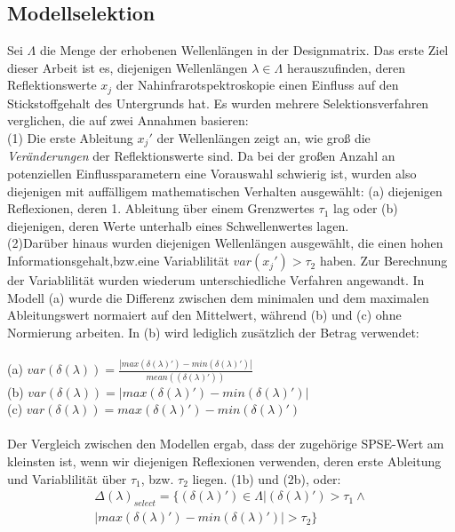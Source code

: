 	\subsection{Modellselektion}
	\label{ssec:modellselektion}
	Sei $\Lambda$ die Menge der erhobenen Wellenlängen in der Designmatrix.
	Das erste Ziel dieser Arbeit ist es, diejenigen Wellenlängen $\lambda\in\Lambda$ herauszufinden, deren Reflektionswerte $x_j$ der Nahinfrarotspektroskopie einen Einfluss auf den Stickstoffgehalt des Untergrunds hat.  Es wurden mehrere Selektionsverfahren verglichen, die auf zwei Annahmen basieren: \\
	(1) Die erste Ableitung $x_j'$ der Wellenlängen zeigt an, wie groß die \textit{Veränderungen} der Reflektionswerte sind. Da bei der großen Anzahl an potenziellen Einflussparametern eine Vorauswahl schwierig ist, wurden also diejenigen mit auffälligem mathematischen Verhalten ausgewählt: (a) diejenigen Reflexionen, deren 1. Ableitung über einem Grenzwertes $\tau_1$ lag oder (b) diejenigen, deren Werte unterhalb eines Schwellenwertes lagen.\\
	(2)Darüber hinaus wurden diejenigen Wellenlängen ausgewählt, die einen hohen Informationsgehalt,bzw.eine Variablilität $var(x_j') > \tau_2$ haben. Zur Berechnung der Variablilität wurden wiederum unterschiedliche Verfahren angewandt. In Modell (a) wurde die Differenz zwischen dem minimalen und dem maximalen Ableitungswert normaiert auf den Mittelwert, während (b) und (c) ohne Normierung arbeiten. In (b) wird lediglich zusätzlich der Betrag verwendet: 	\\ \\
	(a) $var(\delta(\lambda)) = \frac{|max(\delta(\lambda)') - min(\delta(\lambda)')|}{mean((\delta(\lambda)'))}$\\
	(b) $var(\delta(\lambda)) = |max(\delta(\lambda)') - min(\delta(\lambda)')|$\\
	(c) $var(\delta(\lambda)) = max(\delta(\lambda)') - min(\delta(\lambda)')$\\ \\
	Der Vergleich zwischen den Modellen ergab, dass der zugehörige SPSE-Wert am kleinsten ist, wenn wir diejenigen Reflexionen verwenden, deren erste Ableitung und Variablilität über $\tau_1$, bzw. $\tau_2$ liegen. (1b) und (2b), oder:
	\begin{align*}
		\varDelta(\lambda)_{select} = \{(\delta(\lambda)') \in \Lambda | (\delta(\lambda)') > \tau_1 \wedge \\|max(\delta(\lambda)') - min(\delta(\lambda)')| > \tau_2\}
	\end{align*}

